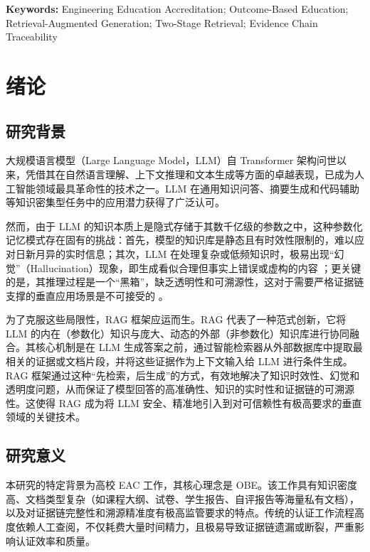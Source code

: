 \documentclass[UTF8,a4paper,zihao=-4]{ctexart}
\begin{document}
{\rmfamily\noindent\textbf{Keywords:} Engineering Education Accreditation; Outcome-Based Education; Retrieval-Augmented Generation; Two-Stage Retrieval; Evidence Chain Traceability}

\newpage

\tableofcontents
\newpage

\clearpage
{}
\setcounter{page}{1}
\section{绪论}

\subsection{研究背景}
大规模语言模型（Large Language Model，LLM）自 Transformer 架构问世以来，凭借其在自然语言理解、上下文推理和文本生成等方面的卓越表现，已成为人工智能领域最具革命性的技术之一。LLM 在通用知识问答、摘要生成和代码辅助等知识密集型任务中的应用潜力获得了广泛认可。

然而，由于 LLM 的知识本质上是隐式存储于其数千亿级的参数之中，这种参数化记忆模式存在固有的挑战：首先，模型的知识库是静态且有时效性限制的，难以应对日新月异的实时信息；其次，LLM 在处理复杂或低频知识时，极易出现“幻觉”（Hallucination）现象，即生成看似合理但事实上错误或虚构的内容 \cite{gao_retrieval-augmented_2024}；更关键的是，其推理过程是一个“黑箱”，缺乏透明性和可溯源性，这对于需要严格证据链支撑的垂直应用场景是不可接受的 \cite{lewis_retrieval-augmented_2021}。

为了克服这些局限性，RAG 框架应运而生。RAG 代表了一种范式创新，它将 LLM 的内在（参数化）知识与庞大、动态的外部（非参数化）知识库进行协同融合。其核心机制是在 LLM 生成答案之前，通过智能检索器从外部数据库中提取最相关的证据或文档片段，并将这些证据作为上下文输入给 LLM 进行条件生成。RAG 框架通过这种“先检索，后生成”的方式，有效地解决了知识时效性、幻觉和透明度问题，从而保证了模型回答的高准确性、知识的实时性和证据链的可溯源性。这使得 RAG 成为将 LLM 安全、精准地引入到对可信赖性有极高要求的垂直领域的关键技术。

\subsection{研究意义}
本研究的特定背景为高校 EAC 工作，其核心理念是 OBE\cite{lzy__2014, lj__2015}。该工作具有知识密度高、文档类型复杂（如课程大纲、试卷、学生报告、自评报告等海量私有文档），以及对证据链完整性和溯源精准度有极高监管要求的特点。传统的认证工作流程高度依赖人工查阅，不仅耗费大量时间精力，且极易导致证据链遗漏或断裂，严重影响认证效率和质量。
\end{document}
